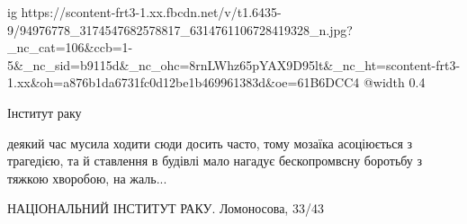  
 
 
 
 

\ifcmt
  ig https://scontent-frt3-1.xx.fbcdn.net/v/t1.6435-9/94976778_3174547682578817_6314761106728419328_n.jpg?_nc_cat=106&ccb=1-5&_nc_sid=b9115d&_nc_ohc=8rnLWhz65pYAX9D95lt&_nc_ht=scontent-frt3-1.xx&oh=a876b1da6731fc0d12be1b469961383d&oe=61B6DCC4
  @width 0.4
\fi

Інститут раку



деякий час мусила ходити сюди досить часто, тому мозаїка асоціюється з
трагедією, та й ставлення в будівлі мало нагадує бескопромвсну боротьбу з
тяжкою хворобою, на жаль...


НАЦІОНАЛЬНИЙ ІНСТИТУТ РАКУ. Ломоносова, 33/43
